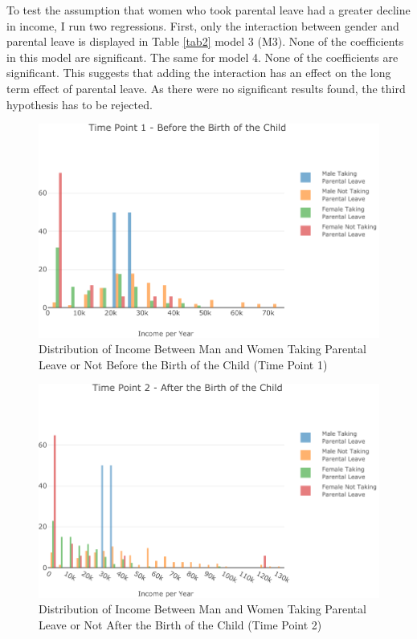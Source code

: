 \documentclass[
  12pt,
]{article}
\begin{document}
To test the assumption that women who took parental leave had a greater decline in income, I run two regressions. First, only the interaction between gender and parental leave is displayed in Table \ref{tab2} model 3 (M3). None of the coefficients in this model are significant. The same for model 4. None of the coefficients are significant. This suggests that adding the interaction has an effect on the long term effect of parental leave. As there were no significant results found, the third hypothesis has to be rejected.

\begin{figure}

{\centering \includegraphics{Parental_Leave-Finalizing-Data-Set_files/figure-latex/fig-5-1} 

}

\caption{Distribution of Income Between Man and Women Taking Parental Leave or Not Before the Birth of the Child (Time Point 1)}\label{fig:fig-5}
\end{figure}

\begin{figure}

{\centering \includegraphics{Parental_Leave-Finalizing-Data-Set_files/figure-latex/fig-6-1} 

}

\caption{Distribution of Income Between Man and Women Taking Parental Leave or Not After the Birth of the Child (Time Point 2)}\label{fig:fig-6}
\end{figure}
\end{document}
